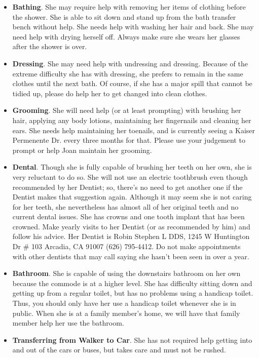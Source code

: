 \documentclass[]{article}
\begin{document}
\begin{itemize}
\item \textbf{Bathing}. She may require help with removing her items of clothing before the shower. She is able to sit down and stand up from the bath transfer bench without help. She needs help with washing her hair and back. She may need help with drying herself off. Always make sure she wears her glasses after the shower is over.
\item \textbf{Dressing}. She may need help with undressing and dressing. Because of the extreme difficulty she has with dressing, she prefers to remain in the same clothes until the next bath. Of course, if she has a major spill that cannot be tidied up, please do help her to get changed into clean clothes.
\item \textbf{Grooming}. She will need help (or at least prompting) with brushing her hair, applying any body lotions, maintaining her fingernails and cleaning her ears. She needs help maintaining her toenails, and is currently seeing a Kaiser Permenente Dr. every three months for that. Please use your judgement to prompt or help Joan maintain her grooming.
\item \textbf{Dental}. Though she is fully capable of brushing her teeth on her own, she is very reluctant to do so. She will not use an electric toothbrush even though recommended by her Dentist; so, there's no need to get another one if the Dentist makes that suggestion again. Although it may seem she is not caring for her teeth, she nevertheless has almost all of her original teeth and no current dental issues. She has crowns and one tooth implant that has been crowned. Make yearly visits to her Dentist (or as recommended by him) and follow his advice. Her Dentist is Robin Stephen L DDS, 1245 W Huntington Dr \# 103 Arcadia, CA 91007 (626) 795-4412. Do not make appointments with other dentists that may call saying she hasn't been seen in over a year.
\item \textbf{Bathroom}. She is capable of using the downstairs bathroom on her own because the commode is at a higher level. She has difficulty sitting down and getting up from a regular toilet, but has no problems using a handicap toilet. Thus, you should only have her use a handicap toilet whenever she is in public. When she is at a family member's home, we will have that family member help her use the bathroom.
\item \textbf{Transferring from Walker to Car}. She has not required help getting into and out of the cars or buses, but takes care and must not be rushed.

\end{itemize}
\end{document}
